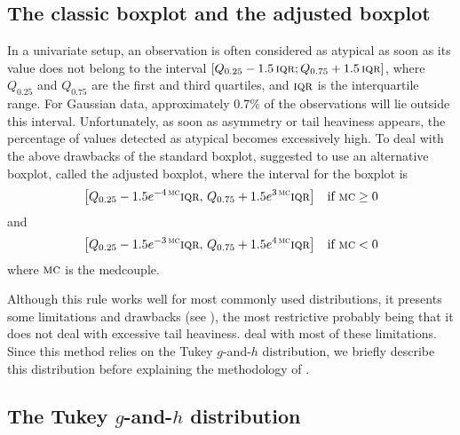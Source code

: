 \subsection{The classic boxplot and the adjusted boxplot}

In a univariate setup, an observation is often considered as atypical as soon
as its value does not belong to the interval $[Q_{0.25} - 1.5\,\stsc{IQR};
Q_{0.75} + 1.5\,\stsc{IQR}]$, where $Q_{0.25}$ and $Q_{0.75}$ are the first and
third quartiles, and $\stsc{IQR}$ is the interquartile range. For Gaussian
data, approximately 0.7\% of the observations will lie outside this interval.
Unfortunately, as soon as asymmetry or tail heaviness appears, the percentage
of values detected as atypical becomes excessively high. To deal with the above
drawbacks of the standard boxplot, \citet{hubert:vandervieren:2008} suggested
to use an alternative boxplot, called the adjusted boxplot, where the interval
for the boxplot is
\[
    \left[Q_{0.25} - 1.5 e^{-4\,\stsc{MC}} \stsc{IQR},\,
          Q_{0.75} + 1.5 e^{3\,\stsc{MC}} \stsc{IQR}\right] \quad \text{if $\stsc{MC} \geq 0$}
\]
and 
\[
    \left[Q_{0.25} - 1.5 e^{-3\,\stsc{MC}} \stsc{IQR},\,
    Q_{0.75} + 1.5e^{4\,\stsc{MC}} \stsc{IQR}\right] \quad \text{if $\stsc{MC} < 0$}
\]
where $\stsc{MC}$ is the medcouple.

Although this rule works well for most commonly used distributions, it presents
some limitations and drawbacks (see \citealp{Bruffaerts:etal:2014}), the most
restrictive probably being that it does not deal with excessive tail heaviness.
\citet{Bruffaerts:etal:2014} deal with most of these limitations. Since this
method relies on the Tukey $g$-and-$h$ distribution, we briefly describe this
distribution before explaining the methodology of \citet{Bruffaerts:etal:2014}.

\subsection{The Tukey $g$-and-$h$ distribution}

